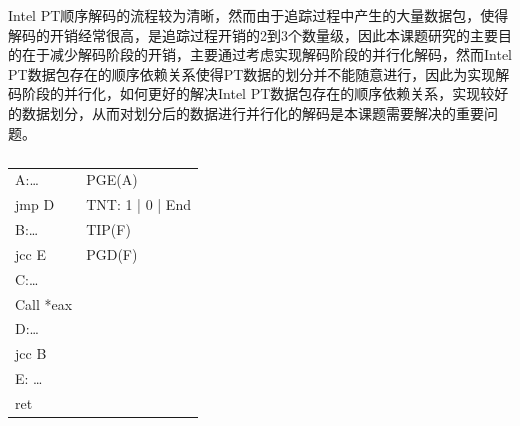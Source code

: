 Intel PT顺序解码的流程较为清晰，然而由于追踪过程中产生的大量数据包，使得解码的开销经常很高，是追踪过程开销的2到3个数量级，因此本课题研究的主要目的在于减少解码阶段的开销，主要通过考虑实现解码阶段的并行化解码，然而Intel PT数据包存在的顺序依赖关系使得PT数据的划分并不能随意进行，因此为实现解码阶段的并行化，如何更好的解决Intel PT数据包存在的顺序依赖关系，实现较好的数据划分，从而对划分后的数据进行并行化的解码是本课题需要解决的重要问题。
\begin{table}[ht]
  \centering
  \caption{}
  \label{tab:2}
  \begin{tabular}{|p{4cm}|p{6cm}|}
    \hline
    A:…& PGE(A)\\
    \quad jmp D& TNT: 1 | 0 | End\\
    B:…& TIP(F)\\
    \quad jcc E& PGD(F)\\
    C:…&\\
    \quad Call *eax&\\
    D:…&\\
    \quad jcc B&\\
    E: …&\\
    \quad ret&\\
    \hline
  \end{tabular}
\end{table}
\fi